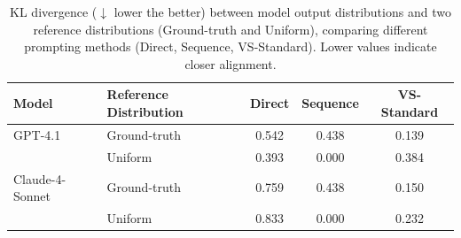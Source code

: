 \begin{table}[!htbp]
\centering
\caption{KL divergence ($\downarrow$ lower the better) between model output distributions and two reference distributions (Ground-truth and Uniform), comparing different prompting methods (Direct, Sequence, VS-Standard). Lower values indicate closer alignment.}
\label{tab:pre_training_data_kl_divergence}
\begin{tabular}{l l c c c}
\toprule
\textbf{Model} & \textbf{Reference Distribution} & \textbf{Direct} & \textbf{Sequence} & \textbf{VS-Standard} \\
\midrule
GPT-4.1 & Ground-truth & 0.542 & 0.438 & 0.139 \\
       & Uniform      & 0.393 & 0.000 & 0.384 \\
\midrule
Claude-4-Sonnet & Ground-truth & 0.759 & 0.438 & 0.150 \\
       & Uniform      & 0.833 & 0.000 & 0.232 \\
\bottomrule
\end{tabular}
\end{table}


